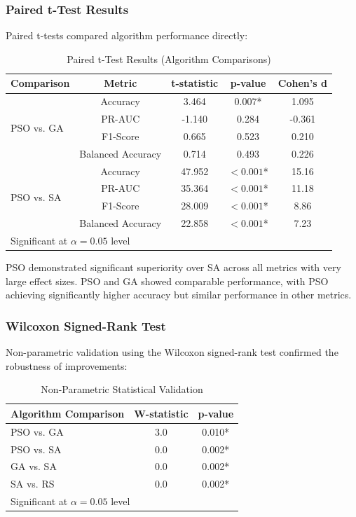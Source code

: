 \subsubsection{Paired t-Test Results}

Paired t-tests compared algorithm performance directly:

\begin{table}[H]
\centering
\caption{Paired t-Test Results (Algorithm Comparisons)}
\label{tab:paired_testing}
\begin{tabular}{lcccc}
\toprule
\textbf{Comparison} & \textbf{Metric} & \textbf{t-statistic} & \textbf{p-value} & \textbf{Cohen's d} \\
\midrule
\multirow{4}{*}{PSO vs. GA} & Accuracy & 3.464 & 0.007* & 1.095 \\
                            & PR-AUC & -1.140 & 0.284 & -0.361 \\
                            & F1-Score & 0.665 & 0.523 & 0.210 \\
                            & Balanced Accuracy & 0.714 & 0.493 & 0.226 \\
\midrule
\multirow{4}{*}{PSO vs. SA} & Accuracy & 47.952 & $< 0.001$* & 15.16 \\
                            & PR-AUC & 35.364 & $< 0.001$* & 11.18 \\
                            & F1-Score & 28.009 & $< 0.001$* & 8.86 \\
                            & Balanced Accuracy & 22.858 & $< 0.001$* & 7.23 \\
\bottomrule
\multicolumn{5}{l}{\small * Significant at $\alpha = 0.05$ level}
\end{tabular}
\end{table}

PSO demonstrated significant superiority over SA across all metrics with very large effect sizes. PSO and GA showed comparable performance, with PSO achieving significantly higher accuracy but similar performance in other metrics.

\subsubsection{Wilcoxon Signed-Rank Test}

Non-parametric validation using the Wilcoxon signed-rank test confirmed the robustness of improvements:

\begin{table}[H]
\centering
\caption{Non-Parametric Statistical Validation}
\label{tab:wilcoxon_test}
\begin{tabular}{lcc}
\toprule
\textbf{Algorithm Comparison} & \textbf{W-statistic} & \textbf{p-value} \\
\midrule
PSO vs. GA & 3.0 & 0.010* \\
PSO vs. SA & 0.0 & 0.002* \\
GA vs. SA & 0.0 & 0.002* \\
SA vs. RS & 0.0 & 0.002* \\
\bottomrule
\multicolumn{3}{l}{\small * Significant at $\alpha = 0.05$ level}
\end{tabular}
\end{table}

